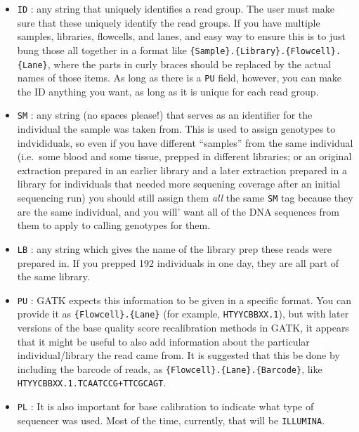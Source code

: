 \documentclass[]{krantz}
\providecommand{\tightlist}{%
  \setlength{\itemsep}{0pt}\setlength{\parskip}{0pt}}
\begin{document}
\begin{itemize}
\tightlist
\item
  \texttt{ID} : any string that uniquely identifies a read group. The user must make sure that
  these uniquely identify the read groups. If you have multiple samples, libraries, flowcells, and
  lanes, and easy way to ensure this is to just bung those all together in a format like
  \texttt{\{Sample\}.\{Library\}.\{Flowcell\}.\{Lane\}}, where the parts in curly braces should be replaced by the
  actual names of those items. As long as there is a \texttt{PU} field, however, you can make the ID
  anything you want, as long as it is unique for each read group.
\item
  \texttt{SM} : any string (no spaces please!) that serves as an identifier for the individual the sample
  was taken from. This is used to assign genotypes to indvididuals, so even if you have different
  ``samples'' from the same individual (i.e.~some blood and some tissue, prepped in different libraries;
  or an original extraction prepared in an earlier library and a later extraction prepared in a library
  for individuals that needed more sequening coverage after an initial sequencing run)
  you should still assign them \emph{all} the same \texttt{SM} tag because they are the same individual, and you will'
  want all of the DNA sequences from them to apply to calling genotypes for them.
\item
  \texttt{LB} : any string which gives the name of the library prep these reads were prepared in. If you prepped
  192 individuals in one day, they are all part of the same library.
\item
  \texttt{PU} : GATK expects this information to be given in a specific format. You can provide it as
  \texttt{\{Flowcell\}.\{Lane\}} (for example, \texttt{HTYYCBBXX.1}), but with later versions of the base quality score
  recalibration methods in GATK, it appears that it might be useful to also add information about
  the particular individual/library the read came from. It is suggested that this be done by
  including the barcode of reads, as \texttt{\{Flowcell\}.\{Lane\}.\{Barcode\}}, like
  \texttt{HTYYCBBXX.1.TCAATCCG+TTCGCAGT}.
\item
  \texttt{PL} : It is also important for base calibration to indicate what type of sequencer was used.
  Most of the time, currently, that will be \texttt{ILLUMINA}.
\end{itemize}
\end{document}
